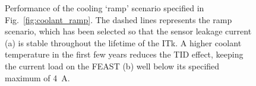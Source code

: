 \begin{figure}[ht]
\centering
{}\quad\quad
{}
\caption{Performance of the cooling `ramp' scenario specified in Fig.~\ref{fig:coolant_ramp}. The dashed lines represents the ramp scenario, which has been selected so that the sensor leakage current (a) is stable throughout the lifetime of the ITk. A higher coolant temperature in the first few years reduces the TID effect, keeping the current load on the FEAST (b) well below its specified maximum of 4~A.}
\label{fig:rampoptimization}
\end{figure}
